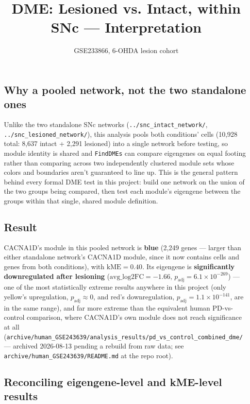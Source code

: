 \documentclass[11pt]{article}
\title{DME: Lesioned vs. Intact, within SNc --- Interpretation}
\author{GSE233866, 6-OHDA lesion cohort}
\date{}
\begin{document}
\maketitle

\subsection*{Why a pooled network, not the two standalone ones}

Unlike the two standalone SNc networks (\texttt{../snc\_intact\_network/},
\texttt{../snc\_lesioned\_network/}), this analysis pools both conditions'
cells (10{,}928 total: 8{,}637 intact + 2{,}291 lesioned) into a single
network before testing, so module identity is shared and \texttt{FindDMEs}
can compare eigengenes on equal footing rather than comparing across two
independently clustered module sets whose colors and boundaries aren't
guaranteed to line up. This is the general pattern behind every formal DME
test in this project: build one network on the union of the two groups
being compared, then test each module's eigengene between the groups
within that single, shared module definition.

\subsection*{Result}

CACNA1D's module in this pooled network is \textbf{blue} (2{,}249 genes ---
larger than either standalone network's CACNA1D module, since it now
contains cells and genes from both conditions), with $\mathrm{kME}=0.40$.
Its eigengene is \textbf{significantly downregulated after lesioning}
($\mathrm{avg\_log2FC}=-1.66$, $p_{\mathrm{adj}} = 6.1\times10^{-269}$) ---
one of the most statistically extreme results anywhere in this project
(only yellow's upregulation, $p_{\mathrm{adj}}\approx0$, and red's
downregulation, $p_{\mathrm{adj}}=1.1\times10^{-141}$, are in the same
range), and far more extreme than the equivalent human PD-vs-control
comparison, where CACNA1D's own module does not reach significance at all
(\texttt{archive/human\_GSE243639/analysis\_results/pd\_vs\_control\_combined\_dme/}
--- archived 2026-08-13 pending a rebuild from raw data; see
\texttt{archive/human\_GSE243639/README.md} at the repo root).

\subsection*{Reconciling eigengene-level and kME-level results}
\end{document}
